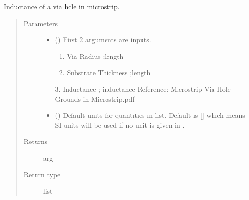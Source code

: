 \documentclass[letterpaper,10pt,english]{sphinxmanual}
\begin{document}

\begin{fulllineitems}
\label{\detokenize{components:components.L_microstrip_via_hole}}
Inductance of a via hole in microstrip.
\begin{quote}\begin{description}
\item[{Parameters}] \leavevmode\begin{itemize}
\item {} 
 () \textendash{} 
First 2 arguments are inputs.
\begin{enumerate}
%
\item {} 
Via Radius ;length

\item {} 
Substrate Thickness ;length

\end{enumerate}

3. Inductance ; inductance
Reference:  Microstrip Via Hole Grounds in Microstrip.pdf


\item {} 
 (\sphinxstyleliteralemphasis{\sphinxupquote{, }}) \textendash{} Default units for quantities in  list. Default is {[}{]} which means SI units will be used if no unit is given in .

\end{itemize}

\item[{Returns}] \leavevmode
arg

\item[{Return type}] \leavevmode
list

\end{description}\end{quote}

\end{fulllineitems}
\end{document}
